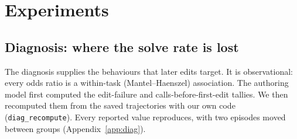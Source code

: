 \section{Experiments}
\label{sec:experiments}
\subsection{Diagnosis: where the solve rate is lost}
\label{sec:diagnosis}
The diagnosis supplies the behaviours that later edits target. It is observational: every odds ratio is a within-task (Mantel--Haenszel) association. The authoring model first computed the edit-failure and calls-before-first-edit tallies. We then recomputed them from the saved trajectories with our own code (\texttt{diag\_recompute}). Every reported value reproduces, with two episodes moved between groups (Appendix~\ref{app:diag}).

